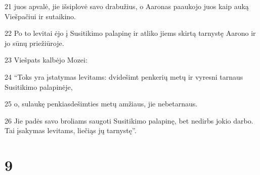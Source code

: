 \par 21 juos apvalė, jie išsiplovė savo drabužius, o Aaronas paaukojo juos kaip auką Viešpačiui ir sutaikino. 
\par 22 Po to levitai ėjo į Susitikimo palapinę ir atliko jiems skirtą tarnystę Aarono ir jo sūnų priežiūroje. 
\par 23 Viešpats kalbėjo Mozei: 
\par 24 “Toks yra įstatymas levitams: dvidešimt penkerių metų ir vyresni tarnaus Susitikimo palapinėje, 
\par 25 o, sulaukę penkiasdešimties metų amžiaus, jie nebetarnaus. 
\par 26 Jie padės savo broliams saugoti Susitikimo palapinę, bet nedirbs jokio darbo. Tai įsakymas levitams, liečiąs jų tarnystę”.



\chapter{9}

